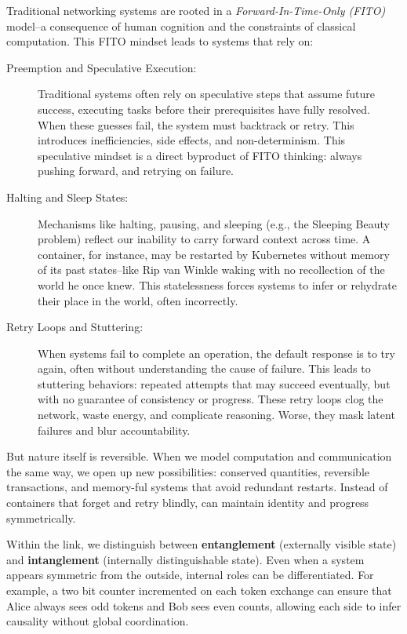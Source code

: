 \documentclass[../OAE-SPEC-MAIN.tex]{subfiles}
\begin{document}
Traditional networking systems are rooted in a \emph{Forward-In-Time-Only (FITO)} model--a consequence of human cognition and the constraints of classical computation. This FITO mindset leads to systems that rely on:
\begin{description}
\item[Preemption and Speculative Execution:]
Traditional systems often rely on speculative steps that assume future success, executing tasks before their prerequisites have fully resolved. When these guesses fail, the system must backtrack or retry. This introduces inefficiencies, side effects, and non-determinism. This speculative mindset is a direct byproduct of FITO thinking: always pushing forward, and retrying on failure.

\item[Halting and Sleep States:]
Mechanisms like halting, pausing, and sleeping (e.g., the Sleeping Beauty problem) reflect our inability to carry forward context across time. A container, for instance, may be restarted by Kubernetes without memory of its past states--like Rip van Winkle waking with no recollection of the world he once knew. This statelessness forces systems to infer or rehydrate their place in the world, often incorrectly.

\item[Retry Loops and Stuttering:]
When systems fail to complete an operation, the default response is to try again, often without understanding the cause of failure. This leads to stuttering behaviors: repeated attempts that may succeed eventually, but with no guarantee of consistency or progress. These retry loops clog the network, waste energy, and complicate reasoning. Worse, they mask latent failures and blur accountability.
\end{description}

But nature itself is reversible. When we model computation and communication the same way, we open up new possibilities: conserved quantities, reversible transactions, and memory-ful systems that avoid redundant restarts. Instead of containers that forget and retry blindly, \LINKs can maintain identity and progress symmetrically.

Within the link, we distinguish between \textbf{entanglement} (externally visible state) and \textbf{intanglement} (internally distinguishable state). Even when a system appears symmetric from the outside, internal roles can be differentiated. For example, a two bit counter incremented on each token exchange can ensure that Alice always sees odd tokens and Bob sees even counts, allowing each side to infer causality without global coordination.
\end{document}
